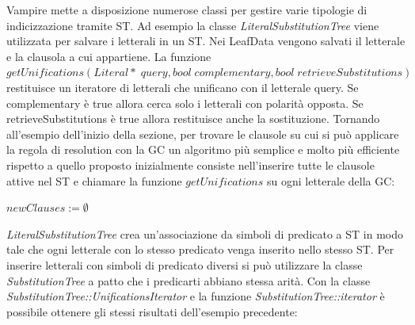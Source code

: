 \documentclass[./main.tex]{subfiles}
\begin{document}
Vampire mette a disposizione numerose classi per gestire varie tipologie di indicizzazione tramite ST.
Ad esempio la classe \textit{LiteralSubstitutionTree} viene utilizzata per salvare i letterali in un ST.
Nei LeafData vengono salvati il letterale e la clausola a cui appartiene.
La funzione $getUnifications(Literal*\; query, bool\; complementary, bool\; retrieveSubstitutions)$ 
restituisce un iteratore di 
letterali che unificano con il letterale query. Se complementary è true allora cerca solo i letterali con polarità opposta.
Se retrieveSubstitutions è true allora restituisce anche la sostituzione.
Tornando all'esempio dell'inizio della sezione, per trovare le clausole su cui si può applicare la regola di resolution
con la GC un algoritmo più semplice e molto più efficiente rispetto a quello proposto inizialmente
consiste nell'inserire tutte le clausole attive nel ST e
chiamare la funzione $getUnifications$ su ogni letterale della GC:

$newClauses := \emptyset$\;\\


\textit{LiteralSubstitutionTree} crea un'associazione da simboli di predicato a ST in modo tale che ogni letterale 
con lo stesso predicato venga inserito nello stesso ST. 
Per inserire letterali con simboli di predicato diversi si può utilizzare la classe \textit{SubstitutionTree} a patto 
che i predicarti abbiano stessa arità. Con la classe \textit{SubstitutionTree::UnificationsIterator} e 
la funzione \textit{SubstitutionTree::iterator} è possibile ottenere gli stessi risultati dell'esempio precedente:
\end{document}

